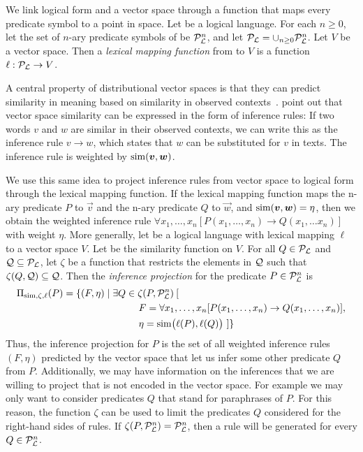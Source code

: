 We link logical form and a vector space through a function that maps every
predicate symbol to a point in space. Let \loglang be a logical language. For
each $n \ge 0$, let the set of $n$-ary predicate symbols of \loglang be
${\cal{P}}_{{\cal{L}}}^n$, and let ${\cal{P}}_{{\cal{L}}} = \cup_{n \ge 0}
{\cal{P}}_{{\cal{L}}}^n$. Let $V$ be a vector space. Then a \emph{lexical mapping
function} from \loglang to $V$ is a function $\ell:
{\cal{P}}_{{\cal{L}}} \to V$.

A central property of distributional vector spaces is that they can predict
similarity in meaning based on similarity in observed
contexts~\citep{harris:wj1954}. \citet{lin:nlej2001} point out that vector space
similarity can be expressed in the form of inference rules: If two words $v$ and
$w$ are similar in their observed contexts, we can write this as the inference
rule $v \to w$, which states that $w$ can be substituted for $v$ in texts. The
inference rule is weighted by $\simfunc(\vec v, \vec w)$.

We use this same idea to project inference rules from vector space to logical
form through the lexical mapping function. If the lexical mapping function maps
the n-ary predicate $P$ to $\vec v$ and the n-ary predicate $Q$ to $ \vec w$,
and $\simfunc(\vec v, \vec w) = \eta$, then we obtain the weighted inference
rule $\forall x_1, \ldots, x_n[ P(x_1, \ldots, x_n) \to Q(x_1, \ldots x_n) ]$
with weight $\eta$. More generally, let \loglang be a logical language with
lexical mapping $\ell$ to a vector space $V$. Let \simfunc{} be the similarity
function on $V$. 
For all $Q \in {\cal{P}}_{{\cal{L}}}$ and ${\cal Q} \subseteq
{\cal{P}}_{{\cal{L}}}$, let $\zeta$ be a function that restricts the elements in 
${\cal Q}$ such that $\zeta(Q, {\cal Q}) \subseteq {\cal Q}$. Then the
\emph{inference projection} for the predicate $P \in {\cal{P}}_{{\cal{L}}}^n$ is
\begin{align*}
&\Pi_{\simfunc, \zeta, \ell}(P) = \{ (F, \eta) \mid \exists Q \in \zeta(P, \predsym{\loglang}^n)\:[ \\ 
& \hspace{125px} F = \forall x_1, \ldots, x_n[P(x_1, \ldots, x_n) \to Q(x_1, \ldots, x_n)], \\
& \hspace{125px} \eta = \simfunc\big(\ell(P), \ell(Q)\big) ~] \}
\end{align*}
Thus, the inference projection for $P$ is the set of all weighted inference
rules $(F, \eta)$ predicted by the vector space that let us infer some
other predicate $Q$ from $P$. Additionally, we may have information on the 
inferences that we are willing to project that is not encoded in the vector 
space. For example we may only want to consider
predicates $Q$ that stand for paraphrases of $P$. For this reason, the
function $\zeta$ can be used to limit the predicates $Q$ considered for the right-hand
sides of rules. If $\zeta(P, {\cal{P}}_{{\cal{L}}}^n) =
{\cal{P}}_{{\cal{L}}}^n$, then a rule will
be generated for every $Q \in {\cal{P}}_{{\cal{L}}}^n$. 


